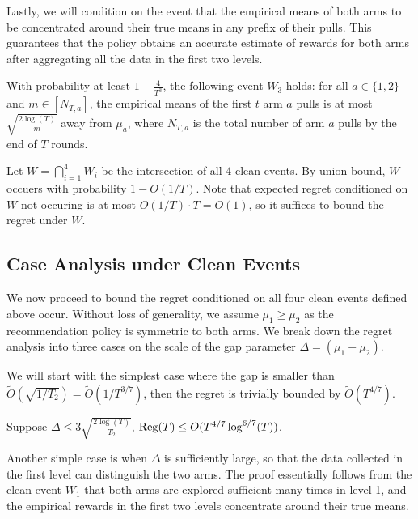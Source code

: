 Lastly, we will condition on the event that the empirical means of
both arms to be concentrated around their true means in any prefix of
their pulls. This guarantees that the policy obtains an accurate
estimate of rewards for both arms after aggregating all the data in
the first two levels.


\begin{lemma}\label{3levelw3}
  With probability at least $1 - \frac{4}{T^3}$, the following event
  $W_3$ holds: for all $a\in \{1, 2\}$ and $m \in [N_{T, a}]$, the
  empirical means of the first $t$ arm $a$ pulls is at most
  $\sqrt{\frac{2\log(T)}{m}}$ away from $\mu_a$, where $N_{T, a}$ is
  the total number of arm $a$ pulls by the end of $T$ rounds.
\end{lemma}




Let $W = \bigcap_{i=1}^4 W_i$ be the intersection of all 4 clean
events.  By union bound, $W$ occuers with probability $1-O(1/T)$. Note
that expected regret conditioned on $W$ not occuring is at most
$O(1/T) \cdot T = O(1)$, so it suffices to bound the regret under $W$.

\subsection{Case Analysis under Clean Events}

We now proceed to bound the regret conditioned on all four clean
events defined above occur. Without loss of generality, we assume
$\mu_1 \geq \mu_2$ as the recommendation policy is symmetric to both
arms. We break down the regret analysis into three cases on the scale
of the gap parameter $\Delta = (\mu_1-\mu_2)$.


We will start with the simplest case where the gap is smaller than
$\tilde O(\sqrt{1/T_2}) = \tilde O(1/T^{3/7})$, then the regret is
trivially bounded by $\tilde O(T^{4/7})$.

\begin{claim}
  Suppose $\Delta \leq 3\sqrt{\frac{2\log(T)}{T_2}}$,
  $\mathrm{Reg}(T)\leq O(T^{4/7} \log^{6/7}(T))$.
\end{claim}

Another simple case is when $\Delta$ is sufficiently large, so that
the data collected in the first level can distinguish the two
arms. The proof essentially follows from the clean event $W_1$ that
both arms are explored sufficient many times in level 1, and the
empirical rewards in the first two levels concentrate around their
true means.

